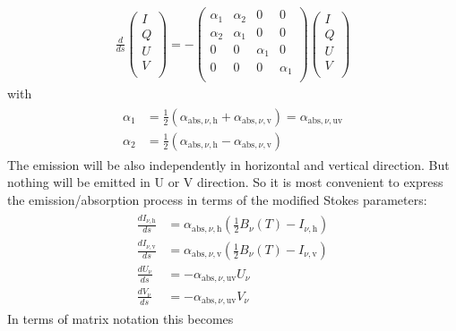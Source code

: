 \documentclass[letterpaper,10pt,english]{sphinxmanual}
\begin{document}
\begin{equation*}
\begin{split}\frac{d}{ds}
\left(\begin{matrix}
I \\
Q \\
U \\
V \\
\end{matrix}\right)
= -
\left(\begin{matrix}
\alpha_1 & \alpha_2 & 0 & 0 \\
\alpha_2 & \alpha_1 & 0 & 0  \\
0 & 0 & \alpha_1 & 0 \\
0 & 0 & 0 & \alpha_1 \\
\end{matrix}\right)
\left(\begin{matrix}
I \\
Q \\
U \\
V \\
\end{matrix}\right)\end{split}
\end{equation*}
with
\begin{equation*}
\begin{split}\begin{split}
\alpha_1 &= \frac{1}{2}\left(\alpha_{\mathrm{abs},\nu,\mathrm{h}}+\alpha_{\mathrm{abs},\nu,\mathrm{v}}\right)
= \alpha_{\mathrm{abs},\nu,\mathrm{uv}}\\
\alpha_2 &= \frac{1}{2}\left(\alpha_{\mathrm{abs},\nu,\mathrm{h}}-\alpha_{\mathrm{abs},\nu,\mathrm{v}}\right)
\end{split}\end{split}
\end{equation*}
The emission will be also independently in horizontal and vertical
direction. But nothing will be emitted in U or V direction. So it is most
convenient to express the emission/absorption process in terms of the
modified Stokes parameters:
\begin{equation*}
\begin{split}\begin{split}
\frac{dI_{\nu,\mathrm{h}}}{ds} &= \alpha_{\mathrm{abs},\nu,\mathrm{h}} (\frac{1}{2}B_\nu(T)-I_{\nu,\mathrm{h}}) \\
\frac{dI_{\nu,\mathrm{v}}}{ds} &= \alpha_{\mathrm{abs},\nu,\mathrm{v}} (\frac{1}{2}B_\nu(T)-I_{\nu,\mathrm{v}}) \\
\frac{dU_{\nu}}{ds} &= -\alpha_{\mathrm{abs},\nu,\mathrm{uv}} U_{\nu} \\
\frac{dV_{\nu}}{ds} &= -\alpha_{\mathrm{abs},\nu,\mathrm{uv}} V_{\nu}
\end{split}\end{split}
\end{equation*}
In terms of matrix notation this becomes
\end{document}
